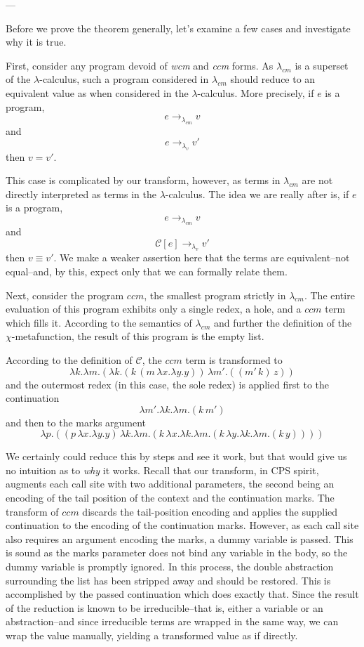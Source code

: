 \documentclass[ms,electronic,twosidetoc,letterpaper,chaptercenter,parttop]{byumsphd}
\newcommand{\lvrr}{\rightarrow_{\lambda_v}}
\newcommand{\cmrr}{\rightarrow_{\lambda_{cm}}}
\newcommand{\C}[1]{\mathcal{C}[#1]}
\begin{document}
---

Before we prove the theorem generally, let's examine a few cases and investigate why it is 
true.

First, consider any program devoid of \emph{wcm} and \emph{ccm} forms. As $\lambda_{cm}$ is 
a superset of the $\lambda$-calculus, such a program considered in $\lambda_{cm}$ should 
reduce to an equivalent value as when considered in the $\lambda$-calculus. More precisely, 
if $e$ is a program,
\[
e\cmrr v
\]
and
\[
e\lvrr v'
\]
then $v=v'$. 

This case is complicated by our transform, however, as terms in $\lambda_{cm}$ are not 
directly interpreted as terms in the $\lambda$-calculus. The idea we are really after is, 
if $e$ is a program,
\[
e\cmrr v
\]
and
\[
\C{e}\lvrr v'
\]
then $v\equiv v'$. We make a weaker assertion here that the terms are equivalent--not 
equal--and, by this, expect only that we can formally relate them.

Next, consider the program $ccm$, the smallest program strictly in $\lambda_{cm}$. 
The entire evaluation of this program exhibits only a single redex, a hole, and a $ccm$ 
term which fills it. According to the semantics of $\lambda_{cm}$ and further the definition of the 
$\chi$-metafunction, the result of this program is the empty list.

According to the definition of $\mathcal{C}$, the $ccm$ term is transformed to
\[
\lambda k.\lambda m.(\lambda k.(k\,(m\,\lambda x.\lambda y.y))\,\lambda m'.((m'\,k)\,z))
\]
and the outermost redex (in this case, the sole redex) is applied first to the continuation
\[
\lambda m'.\lambda k.\lambda m.(k\,m')
\]
and then to the marks argument
\[
\lambda p.((p\,\lambda x.\lambda y.y)\,\lambda k.\lambda m.(k\,\lambda x.\lambda k.\lambda m.(k\,\lambda y.\lambda k.\lambda m.(k\,y))))
\]

We certainly could reduce this by steps and see it work, but that would give us no intuition as to \emph{why} it works. Recall that our transform, in CPS spirit, augments each call site with two additional parameters, the second being an encoding of the tail position of the context and the continuation marks. The transform of $ccm$ discards the tail-position encoding and applies the supplied continuation to the encoding of the continuation marks. However, as each call site also requires an argument encoding the marks, a dummy variable is passed. This is sound as the marks parameter does not bind any variable in the body, so the dummy variable is promptly ignored. In this process, the double abstraction surrounding the list has been stripped away and should be restored. This is accomplished by the passed continuation which does exactly that. Since the result of the reduction is known to be irreducible--that is, either a variable or an abstraction--and since irreducible terms are wrapped in the same way, we can wrap the value manually, yielding a transformed value as if directly.
\end{document}
